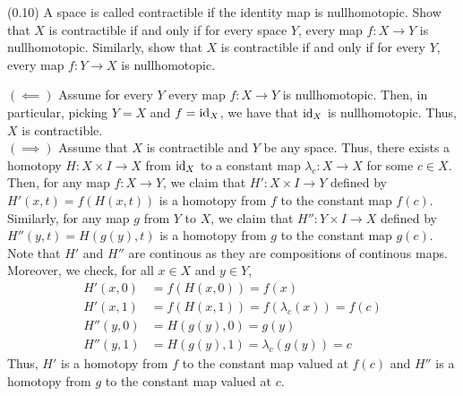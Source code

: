 \documentclass[12pt]{article}
\begin{document}

\begin{problem}{1}
(0.10) A space is called contractible if the identity map is nullhomotopic. Show that \( X \) is contractible if and only if for every space \( Y \), every map \( f : X \to Y \) is nullhomotopic. Similarly, show that \( X \) is contractible if and only if for every \( Y \), every map \( f : Y \to X \) is nullhomotopic.
\end{problem}
\begin{solution}
    $(\impliedby)$ Assume for every $Y$ every map $f : X \to Y$ is nullhomotopic. Then, in particular, picking $Y = X$ and $f = \operatorname{id}_X$, we have that $\operatorname{id}_X$ is nullhomotopic. Thus, $X$ is contractible. \\
    $(\implies)$ Assume that $X$ is contractible and $Y$ be any space. Thus, there exists a homotopy $H: X \times I \to X$ from $\operatorname{id}_X$ to a constant map $\lambda_c : X \to X$ for some $c \in X$. Then, for any map $f : X \to Y$, we claim that $H': X \times I \to Y$ defined by $H'(x, t) = f(H(x, t))$ is a homotopy from $f$ to the constant map $f(c)$. Similarly, for any map $g$ from $Y$ to $X$, we claim that $H'': Y \times I \to X$ defined by $H''(y, t) = H(g(y), t)$ is a homotopy from $g$ to the constant map $g(c)$. Note that $H'$ and $H''$ are continous as they are compositions of continous maps. Moreover, we check, for all $x \in X$ and $y \in Y$,
    \begin{align*}
        H'(x, 0) &= f(H(x, 0)) = f(x) \\
        H'(x, 1) &= f(H(x, 1)) = f(\lambda_c(x)) = f(c) \\
        H''(y, 0) &= H(g(y), 0) = g(y) \\
        H''(y, 1) &= H(g(y), 1) = \lambda_c(g(y)) = c
    \end{align*}
    Thus, $H'$ is a homotopy from $f$ to the constant map valued at $f(c)$ and $H''$ is a homotopy from $g$ to the constant map valued at $c$.
\end{solution}
\newpage
\end{document}
